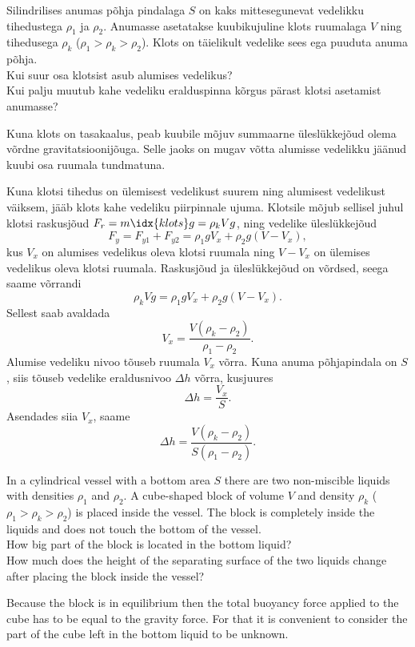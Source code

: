 
Silindrilises anumas põhja pindalaga $S$ on kaks mittesegunevat vedelikku tihedustega $\rho_1$ ja $\rho_2$. Anumasse asetatakse kuubikujuline klots ruumalaga $V$ ning tihedusega $\rho_k$ ($\rho_1>\rho_k>\rho_2$). Klots on täielikult vedelike sees ega puuduta anuma põhja.\\
\osa Kui suur osa klotsist asub alumises vedelikus?\\
\osa Kui palju muutub kahe vedeliku eralduspinna kõrgus pärast klotsi asetamist anumasse?

\hint
Kuna klots on tasakaalus, peab kuubile mõjuv summaarne üleslükkejõud olema võrdne gravitatsioonijõuga. Selle jaoks on mugav võtta alumisse vedelikku jäänud kuubi osa ruumala tundmatuna.

\solu
Kuna klotsi tihedus on ülemisest vedelikust suurem ning alumisest vedelikust väiksem, jääb klots kahe vedeliku piirpinnale ujuma. Klotsile mõjub sellisel juhul klotsi raskusjõud $F_r = m\idx{klots}g=\rho_k Vg$, ning vedelike üleslükkejõud
\[ F_y=F_{y1}+F_{y2}=\rho_1gV_x + \rho_2g(V-V_x), \]
kus $V_x$ on alumises vedelikus oleva klotsi ruumala ning $V-V_x$ on ülemises vedelikus oleva klotsi ruumala.
Raskusjõud ja üleslükkejõud on võrdsed, seega saame võrrandi
\[ \rho_k Vg = \rho_1gV_x + \rho_2g(V-V_x). \]
Sellest saab avaldada 
\[ V_x = \frac{V(\rho_k-\rho_2)}{\rho_1-\rho_2}. \]
Alumise vedeliku nivoo tõuseb ruumala $V_x$ võrra. Kuna anuma põhjapindala on $S$, siis tõuseb vedelike eraldusnivoo $\Delta h$ võrra, kusjuures
\[ \Delta h = \frac{V_x}{S}. \]
Asendades siia $V_x$, saame
\[ \Delta h = \frac{V(\rho_k-\rho_2)}{S(\rho_1-\rho_2)}. \]

In a cylindrical vessel with a bottom area $S$ there are two non-miscible liquids with densities $\rho_1$ and $\rho_2$. A cube-shaped block of volume $V$ and density $\rho_k$ ($\rho_1>\rho_k>\rho_2$) is placed inside the vessel. The block is completely inside the liquids and does not touch the bottom of the vessel.\\
\osa How big part of the block is located in the bottom liquid?\\
\osa How much does the height of the separating surface of the two liquids change after placing the block inside the vessel?

\hinteng
Because the block is in equilibrium then the total buoyancy force applied to the cube has to be equal to the gravity force. For that it is convenient to consider the part of the cube left in the bottom liquid to be unknown.

